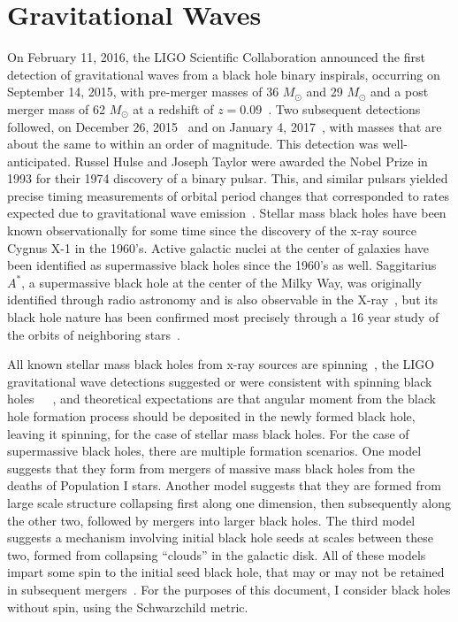 \section{Gravitational Waves}

On February 11, 2016, the LIGO Scientific Collaboration announced the
first detection of gravitational waves from a black hole binary
inspirals, occurring on September 14, 2015, with pre-merger masses of
36 $M_\odot$ and 29 $M_\odot$ and a post merger mass of 62 $M_\odot$
at a redshift of $z=0.09$~\cite{GW150914}. Two subsequent detections
followed, on December 26, 2015~\cite{GW151226} and on January 4,
2017~\cite{GW170104}, with masses that are about the same to within an order of magnitude. This detection was well-anticipated. Russel Hulse and Joseph Taylor were awarded the Nobel Prize in 1993 for their 1974 discovery of a binary pulsar. This, and similar pulsars yielded precise timing measurements of orbital period changes that corresponded to rates expected due to gravitational wave emission~\cite{hulsetaylor}. Stellar mass black holes have been known observationally for some time since the discovery of the x-ray source Cygnus X-1 in the 1960's. Active galactic nuclei at the center of galaxies have been identified as supermassive black holes since the 1960's as well. Saggitarius $A^*$, a supermassive black hole at the center of the Milky Way, was originally identified through radio astronomy and is also observable in the X-ray~\cite{sagastarmultiwavelength}, but its black hole nature has been confirmed most precisely through a 16 year study of the orbits of neighboring stars~\cite{sagastarorbits}. 

All known stellar mass black holes from x-ray sources are spinning~\cite{Bambi2017}, the LIGO gravitational wave detections suggested or were consistent with spinning black holes~\cite{GW150914}~\cite{GW151226}~\cite{GW170104}, and theoretical expectations are that angular moment from the black hole formation process should be deposited in the newly formed black hole, leaving it spinning, for the case of stellar mass black holes. For the case of supermassive black holes, there are multiple formation scenarios. One model suggests that they form from mergers of massive mass black holes from the deaths of Population I stars. Another model suggests that they are formed from large scale structure collapsing first along one dimension, then subsequently along the other two, followed by mergers into larger black holes. The third model suggests a mechanism involving initial black hole seeds at scales between these two, formed from collapsing ``clouds'' in the galactic disk. All of these models impart some spin to the initial seed black hole, that may or may not be retained in subsequent mergers~\cite{formationsmbh}. For the purposes of this document, I consider black holes without spin, using the Schwarzchild metric.


